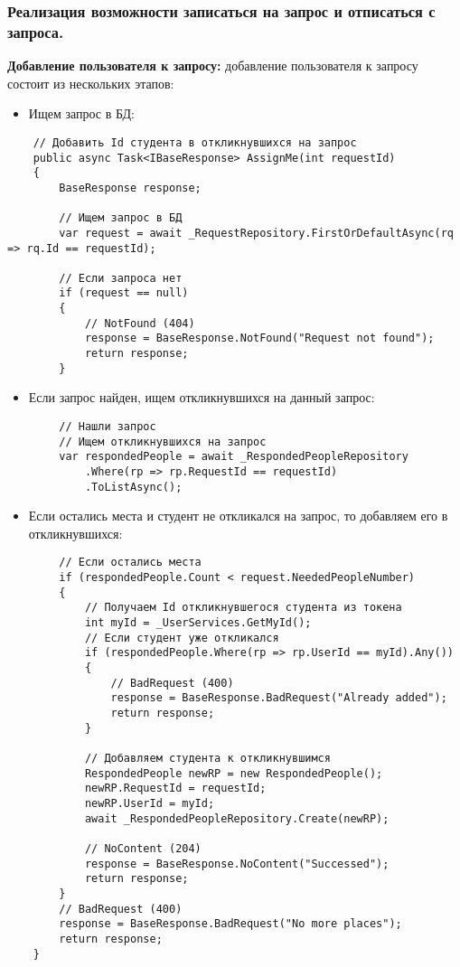 \subsubsection{Реализация возможности записаться на запрос и отписаться с запроса.}

\textbf{Добавление пользователя к запросу:} добавление пользователя к запросу состоит из нескольких этапов:
\begin{itemize}
	\item{Ищем запрос в БД:}
\end{itemize}
\begin{verbatim}
    // Добавить Id студента в откликнувшихся на запрос
    public async Task<IBaseResponse> AssignMe(int requestId)
    {
        BaseResponse response;

        // Ищем запрос в БД
        var request = await _RequestRepository.FirstOrDefaultAsync(rq => rq.Id == requestId);

        // Если запроса нет
        if (request == null)
        {
            // NotFound (404)
            response = BaseResponse.NotFound("Request not found");
            return response;
        }

\end{verbatim}

\begin{itemize}
	\item{Если запрос найден, ищем откликнувшихся на данный запрос:}
\end{itemize}
\begin{verbatim}
        // Нашли запрос
        // Ищем откликнувшихся на запрос
        var respondedPeople = await _RespondedPeopleRepository
            .Where(rp => rp.RequestId == requestId)
            .ToListAsync();
\end{verbatim}

\begin{itemize}
	\item{Если остались места и студент не откликался на запрос, то добавляем его в откликнувшихся:}
\end{itemize}
\begin{verbatim}
        // Если остались места
        if (respondedPeople.Count < request.NeededPeopleNumber)
        {
            // Получаем Id откликнувшегося студента из токена
            int myId = _UserServices.GetMyId();
            // Если студент уже откликался
            if (respondedPeople.Where(rp => rp.UserId == myId).Any())
            {
                // BadRequest (400)
                response = BaseResponse.BadRequest("Already added");
                return response;
            }

            // Добавляем студента к откликнувшимся
            RespondedPeople newRP = new RespondedPeople();
            newRP.RequestId = requestId;
            newRP.UserId = myId;
            await _RespondedPeopleRepository.Create(newRP);

            // NoContent (204)
            response = BaseResponse.NoContent("Successed");
            return response;
        }
        // BadRequest (400)
        response = BaseResponse.BadRequest("No more places");
        return response;
    }
\end{verbatim}

